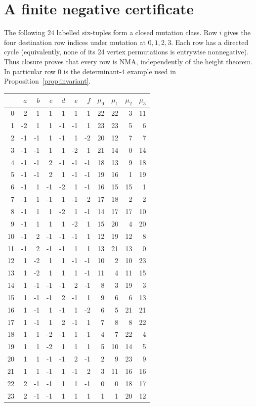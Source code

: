 \section{A finite negative certificate}\label{app:finite}
The following 24 labelled six-tuples form a closed mutation class. Row $i$ gives the four destination row indices under mutation at $0,1,2,3$. Each row has a directed cycle (equivalently, none of its 24 vertex permutations is entrywise nonnegative). Thus closure proves that every row is NMA, independently of the height theorem. In particular row 0 is the determinant-$4$ example used in Proposition~\ref{prop:invariant}.
\begin{center}\small
\begin{tabular}{r rrrrrr rrrr}\toprule
& $a$&$b$&$c$&$d$&$e$&$f$&$\mu_0$&$\mu_1$&$\mu_2$&$\mu_3$\\\midrule
0 & -2 & 1 & 1 & -1 & -1 & -1 & 22 & 22 & 3 & 11 \\
1 & -2 & 1 & 1 & -1 & -1 & 1 & 23 & 23 & 5 & 6 \\
2 & -1 & -1 & 1 & -1 & 1 & -2 & 20 & 12 & 7 & 7 \\
3 & -1 & -1 & 1 & 1 & -2 & 1 & 21 & 14 & 0 & 14 \\
4 & -1 & -1 & 2 & -1 & -1 & -1 & 18 & 13 & 9 & 18 \\
5 & -1 & -1 & 2 & 1 & -1 & -1 & 19 & 16 & 1 & 19 \\
6 & -1 & 1 & -1 & -2 & 1 & -1 & 16 & 15 & 15 & 1 \\
7 & -1 & 1 & -1 & 1 & -1 & 2 & 17 & 18 & 2 & 2 \\
8 & -1 & 1 & 1 & -2 & 1 & -1 & 14 & 17 & 17 & 10 \\
9 & -1 & 1 & 1 & 1 & -2 & 1 & 15 & 20 & 4 & 20 \\
10 & -1 & 2 & -1 & -1 & -1 & 1 & 12 & 19 & 12 & 8 \\
11 & -1 & 2 & -1 & -1 & 1 & 1 & 13 & 21 & 13 & 0 \\
12 & 1 & -2 & 1 & 1 & -1 & -1 & 10 & 2 & 10 & 23 \\
13 & 1 & -2 & 1 & 1 & 1 & -1 & 11 & 4 & 11 & 15 \\
14 & 1 & -1 & -1 & -1 & 2 & -1 & 8 & 3 & 19 & 3 \\
15 & 1 & -1 & -1 & 2 & -1 & 1 & 9 & 6 & 6 & 13 \\
16 & 1 & -1 & 1 & -1 & 1 & -2 & 6 & 5 & 21 & 21 \\
17 & 1 & -1 & 1 & 2 & -1 & 1 & 7 & 8 & 8 & 22 \\
18 & 1 & 1 & -2 & -1 & 1 & 1 & 4 & 7 & 22 & 4 \\
19 & 1 & 1 & -2 & 1 & 1 & 1 & 5 & 10 & 14 & 5 \\
20 & 1 & 1 & -1 & -1 & 2 & -1 & 2 & 9 & 23 & 9 \\
21 & 1 & 1 & -1 & 1 & -1 & 2 & 3 & 11 & 16 & 16 \\
22 & 2 & -1 & -1 & 1 & 1 & -1 & 0 & 0 & 18 & 17 \\
23 & 2 & -1 & -1 & 1 & 1 & 1 & 1 & 1 & 20 & 12 \\
\bottomrule\end{tabular}\end{center}
